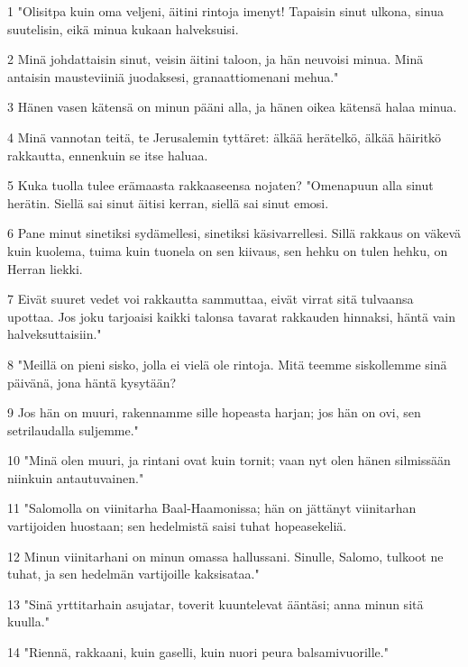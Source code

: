\par 1 "Olisitpa kuin oma veljeni, äitini rintoja imenyt! Tapaisin sinut ulkona, sinua suutelisin, eikä minua kukaan halveksuisi.
\par 2 Minä johdattaisin sinut, veisin äitini taloon, ja hän neuvoisi minua. Minä antaisin mausteviiniä juodaksesi, granaattiomenani mehua."
\par 3 Hänen vasen kätensä on minun pääni alla, ja hänen oikea kätensä halaa minua.
\par 4 Minä vannotan teitä, te Jerusalemin tyttäret: älkää herätelkö, älkää häiritkö rakkautta, ennenkuin se itse haluaa.
\par 5 Kuka tuolla tulee erämaasta rakkaaseensa nojaten? "Omenapuun alla sinut herätin. Siellä sai sinut äitisi kerran, siellä sai sinut emosi.
\par 6 Pane minut sinetiksi sydämellesi, sinetiksi käsivarrellesi. Sillä rakkaus on väkevä kuin kuolema, tuima kuin tuonela on sen kiivaus, sen hehku on tulen hehku, on Herran liekki.
\par 7 Eivät suuret vedet voi rakkautta sammuttaa, eivät virrat sitä tulvaansa upottaa. Jos joku tarjoaisi kaikki talonsa tavarat rakkauden hinnaksi, häntä vain halveksuttaisiin."
\par 8 "Meillä on pieni sisko, jolla ei vielä ole rintoja. Mitä teemme siskollemme sinä päivänä, jona häntä kysytään?
\par 9 Jos hän on muuri, rakennamme sille hopeasta harjan; jos hän on ovi, sen setrilaudalla suljemme."
\par 10 "Minä olen muuri, ja rintani ovat kuin tornit; vaan nyt olen hänen silmissään niinkuin antautuvainen."
\par 11 "Salomolla on viinitarha Baal-Haamonissa; hän on jättänyt viinitarhan vartijoiden huostaan; sen hedelmistä saisi tuhat hopeasekeliä.
\par 12 Minun viinitarhani on minun omassa hallussani. Sinulle, Salomo, tulkoot ne tuhat, ja sen hedelmän vartijoille kaksisataa."
\par 13 "Sinä yrttitarhain asujatar, toverit kuuntelevat ääntäsi; anna minun sitä kuulla."
\par 14 "Riennä, rakkaani, kuin gaselli, kuin nuori peura balsamivuorille."


